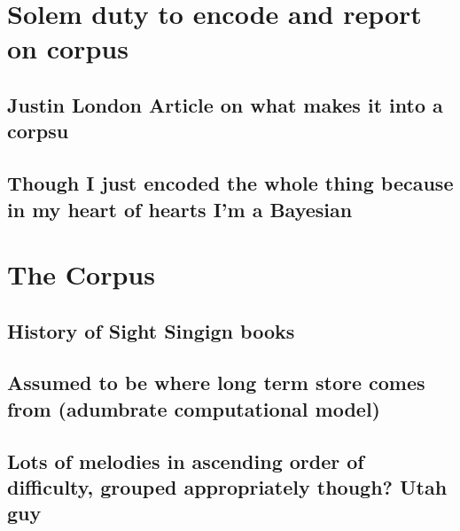 \documentclass[]{book}
\theoremstyle{definition}
\theoremstyle{definition}
\theoremstyle{definition}
\theoremstyle{remark}
\begin{document}
\hypertarget{solem-duty-to-encode-and-report-on-corpus}{%
\section{Solem duty to encode and report on
corpus}\label{solem-duty-to-encode-and-report-on-corpus}}

\hypertarget{justin-london-article-on-what-makes-it-into-a-corpsu}{%
\subsection{Justin London Article on what makes it into a
corpsu}\label{justin-london-article-on-what-makes-it-into-a-corpsu}}

\hypertarget{though-i-just-encoded-the-whole-thing-because-in-my-heart-of-hearts-im-a-bayesian}{%
\subsection{Though I just encoded the whole thing because in my heart of
hearts I'm a
Bayesian}\label{though-i-just-encoded-the-whole-thing-because-in-my-heart-of-hearts-im-a-bayesian}}

\hypertarget{the-corpus}{%
\section{The Corpus}\label{the-corpus}}

\hypertarget{history-of-sight-singign-books}{%
\subsection{History of Sight Singign
books}\label{history-of-sight-singign-books}}

\hypertarget{assumed-to-be-where-long-term-store-comes-from-adumbrate-computational-model}{%
\subsection{Assumed to be where long term store comes from (adumbrate
computational
model)}\label{assumed-to-be-where-long-term-store-comes-from-adumbrate-computational-model}}

\hypertarget{lots-of-melodies-in-ascending-order-of-difficulty-grouped-appropriately-though-utah-guy}{%
\subsection{Lots of melodies in ascending order of difficulty, grouped
appropriately though? Utah
guy}\label{lots-of-melodies-in-ascending-order-of-difficulty-grouped-appropriately-though-utah-guy}}
\end{document}

